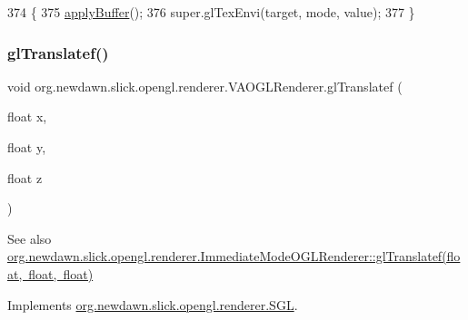 \begin{DoxyCode}
374                                                            \{
375         \mbox{\hyperlink{classorg_1_1newdawn_1_1slick_1_1opengl_1_1renderer_1_1_v_a_o_g_l_renderer_a7c5d09419cd40761be8f849631aebab5}{applyBuffer}}();
376         super.glTexEnvi(target, mode, value);
377     \}
\end{DoxyCode}
\mbox{\label{classorg_1_1newdawn_1_1slick_1_1opengl_1_1renderer_1_1_v_a_o_g_l_renderer_aecc3fbcdf0f59be0faf26a4f98a67c51}} 
\subsubsection{\texorpdfstring{gl\+Translatef()}{glTranslatef()}}
{\footnotesize\ttfamily void org.\+newdawn.\+slick.\+opengl.\+renderer.\+V\+A\+O\+G\+L\+Renderer.\+gl\+Translatef (\begin{DoxyParamCaption}\item[{float}]{x,  }\item[{float}]{y,  }\item[{float}]{z }\end{DoxyParamCaption})\hspace{0.3cm}{\ttfamily [inline]}}

\begin{DoxySeeAlso}{See also}
\mbox{\hyperlink{classorg_1_1newdawn_1_1slick_1_1opengl_1_1renderer_1_1_immediate_mode_o_g_l_renderer_af435628534b92fba8004ef8b4b6b388a}{org.\+newdawn.\+slick.\+opengl.\+renderer.\+Immediate\+Mode\+O\+G\+L\+Renderer\+::gl\+Translatef(float, float, float)}} 
\end{DoxySeeAlso}


Implements \mbox{\hyperlink{interfaceorg_1_1newdawn_1_1slick_1_1opengl_1_1renderer_1_1_s_g_l_a647aff6cabd0c83869166144e9aee833}{org.\+newdawn.\+slick.\+opengl.\+renderer.\+S\+GL}}.


